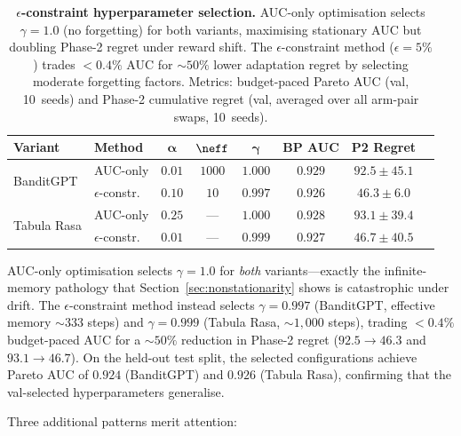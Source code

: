 \begin{table}[t]
\centering
\caption{%
  \textbf{$\epsilon$-constraint hyperparameter selection.}
  AUC-only optimisation selects $\gamma{=}1.0$ (no forgetting) for
  both variants, maximising stationary AUC but doubling Phase-2
  regret under reward shift.
  The $\epsilon$-constraint method ($\epsilon{=}5\%$) trades
  ${<}0.4\%$ AUC for ${\sim}50\%$ lower adaptation regret by
  selecting moderate forgetting factors.
  Metrics: budget-paced Pareto AUC (val, 10~seeds) and Phase-2
  cumulative regret (val, averaged over all arm-pair swaps,
  10~seeds).%
}
\label{tab:hparam_selection}
\small
\begin{tabular}{@{}llcccccc@{}}
\toprule
\textbf{Variant} & \textbf{Method}
  & $\boldsymbol{\alpha}$ & $\boldsymbol{\neff}$
  & $\boldsymbol{\gamma}$
  & \textbf{BP AUC} & \textbf{P2 Regret} \\
\midrule
\multirow{2}{*}{BanditGPT}
  & AUC-only     & $0.01$ & $1000$ & $1.000$ & $0.929$ & $92.5 \pm 45.1$ \\
  & $\epsilon$-constr.\ & $0.10$ & $10$   & $0.997$ & $0.926$ & $\mathbf{46.3 \pm 6.0}$ \\[3pt]
\multirow{2}{*}{Tabula Rasa}
  & AUC-only     & $0.25$ & ---    & $1.000$ & $0.928$ & $93.1 \pm 39.4$ \\
  & $\epsilon$-constr.\ & $0.01$ & ---    & $0.999$ & $0.927$ & $\mathbf{46.7 \pm 40.5}$ \\
\bottomrule
\end{tabular}
\end{table}

AUC-only optimisation selects $\gamma{=}1.0$ for \emph{both}
variants---exactly the infinite-memory pathology that
Section~\ref{sec:nonstationarity} shows is catastrophic under
drift.
The $\epsilon$-constraint method instead selects $\gamma{=}0.997$
(BanditGPT, effective memory ${\sim}333$ steps) and
$\gamma{=}0.999$ (Tabula Rasa, ${\sim}1{,}000$ steps),
trading ${<}0.4\%$ budget-paced AUC for a ${\sim}50\%$ reduction
in Phase-2 regret ($92.5 \to 46.3$ and $93.1 \to 46.7$).
On the held-out test split, the selected configurations achieve
Pareto AUC of $0.924$ (BanditGPT) and $0.926$ (Tabula Rasa),
confirming that the val-selected hyperparameters generalise.

Three additional patterns merit attention:

